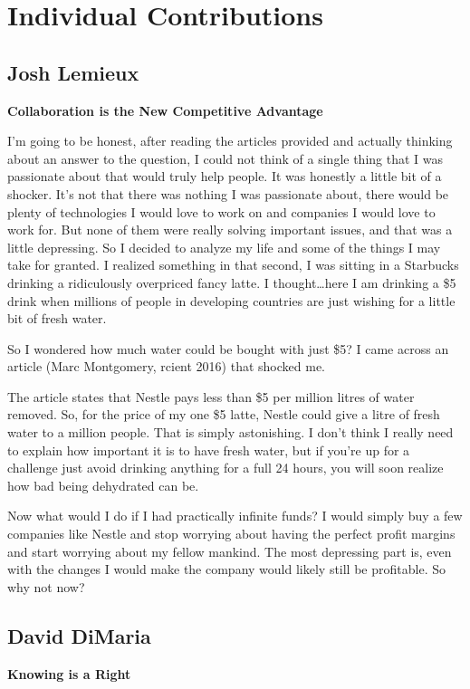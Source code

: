 \documentclass[12pt,letterpaper]{article}
\begin{document}
\clearpage
\section{Individual Contributions}
\subsection{Josh Lemieux}
\textbf{Collaboration is the New Competitive Advantage}\par
I'm going to be honest, after reading the articles provided and actually thinking about an answer to the question, I could not think of a single thing that I was passionate about that would truly help people. It was honestly a little bit of a shocker. It's not that there was nothing I was passionate about, there would be plenty of technologies I would love to work on and companies I would love to work for. But none of them were really solving important issues, and that was a little depressing. So I decided to analyze my life and some of the things I may take for granted. I realized something in that second, I was sitting in a Starbucks drinking a ridiculously overpriced fancy latte. I thought\ldots here I am drinking a \$5 drink when millions of people in developing countries are just wishing for a little bit of fresh water.\par
So I wondered how much water could be bought with just \$5? I came across an article (Marc Montgomery, rcient 2016) that shocked me.\par
The article states that Nestle pays less than \$5 per million litres of water removed. So, for the price of my one \$5 latte, Nestle could give a litre of fresh water to a million people. That is simply astonishing. I don't think I really need to explain how important it is to have fresh water, but if you're up for a challenge just avoid drinking anything for a full 24 hours, you will soon realize how bad being dehydrated can be.\par
Now what would I do if I had practically infinite funds? I would simply buy a few companies like Nestle and stop worrying about having the perfect profit margins and start worrying about my fellow mankind. The most depressing part is, even with the changes I would make the company would likely still be profitable. So why not now?



\clearpage
\subsection{David DiMaria}
\textbf{Knowing is a Right}
\end{document}
